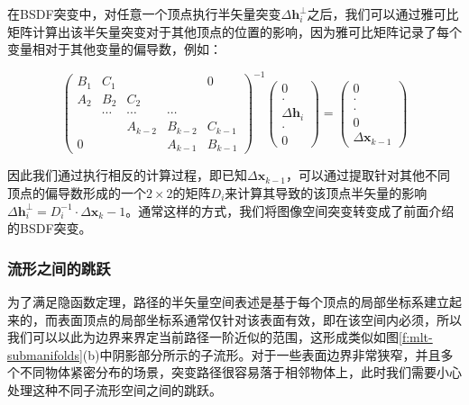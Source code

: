 在BSDF突变中，对任意一个顶点执行半矢量突变$\Delta\mathbf{h}^{\perp}_i$之后，我们可以通过雅可比矩阵计算出该半矢量突变对于其他顶点的位置的影响，因为雅可比矩阵记录了每个变量相对于其他变量的偏导数，例如：

\begin{equation}
	\begin{pmatrix}
		B_1 & C_1    &         &         & 0\\
		A_2 & B_2    &  C_2    &         &  \\
		    & \cdots & \cdots  & \cdots  &  \\
		    &        & A_{k-2} & B_{k-2} & C_{k-1}\\
		0   &        &         & A_{k-1} & B_{k-1}
	\end{pmatrix}^{-1}\begin{pmatrix}
		0\\
		\cdot\\
		\Delta\mathbf{h}_i\\
		\cdot\\
		0
	\end{pmatrix}=\begin{pmatrix}
		0\\
		\cdot\\
		\cdot\\
		0\\
		\Delta\mathbf{x}_{k-1}
	\end{pmatrix}
\end{equation}

\noindent 因此我们通过执行相反的计算过程，即已知$\Delta\mathbf{x}_{k-1}$，可以通过提取针对其他不同顶点的偏导数形成的一个$2\times 2$的矩阵$D_i$来计算其导致的该顶点半矢量的影响$\Delta\mathbf{h}^{\perp}_i=D^{-1}_i\cdot\Delta\mathbf{x}_k-1$。通常这样的方式，我们将图像空间突变转变成了前面介绍的BSDF突变。






\subsubsection{流形之间的跳跃}
为了满足隐函数定理\cite{b:CalculusonManifolds:AModernApproachtoClassicalTheoremsofAdvancedCalculus}，路径的半矢量空间表述是基于每个顶点的局部坐标系建立起来的，而表面顶点的局部坐标系通常仅针对该表面有效，即在该空间内必须，所以我们可以以此为边界来界定当前路径一阶近似的范围，这形成类似如图\ref{f:mlt-submanifolds}(b)中阴影部分所示的子流形。对于一些表面边界非常狭窄，并且多个不同物体紧密分布的场景，突变路径很容易落于相邻物体上，此时我们需要小心处理这种不同子流形空间之间的跳跃。

